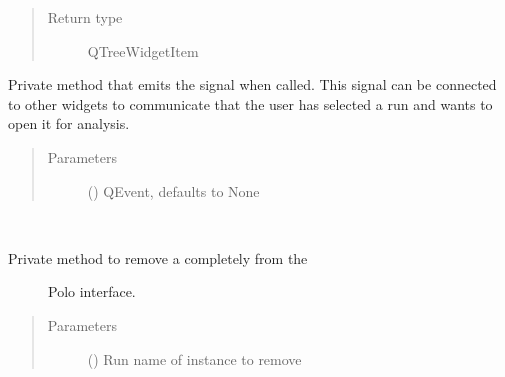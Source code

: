 \documentclass[letterpaper,10pt,english]{sphinxmanual}
\begin{document}
\begin{fulllineitems}
\begin{fulllineitems}
\begin{quote}
\begin{description}
\item[{Return type}] \leavevmode
QTreeWidgetItem

\end{description}\end{quote}

\end{fulllineitems}


\begin{fulllineitems}
\label{\detokenize{polo.widgets:polo.widgets.run_tree.RunTree._open_run_slot}}
Private method that emits the {\hyperref[\detokenize{polo.widgets:polo.widgets.run_tree.RunTree.opening_run}]{}} signal when called. This
signal can be connected to other widgets to communicate that the user
has selected a run and wants to open it for analysis.
\begin{quote}\begin{description}
\item[{Parameters}] \leavevmode
{} (\sphinxstyleliteralemphasis{\sphinxupquote{, }}) \textendash{} QEvent, defaults to None

\end{description}\end{quote}

\end{fulllineitems}


\begin{fulllineitems}
\label{\detokenize{polo.widgets:polo.widgets.run_tree.RunTree._remove_run}}~\begin{description}
\item[{Private method to remove a  completely from the}] \leavevmode
Polo interface.

\end{description}
\begin{quote}\begin{description}
\item[{Parameters}] \leavevmode
{} () \textendash{} Run name of  instance to remove


\end{description}
\end{quote}
\end{fulllineitems}
\end{fulllineitems}
\end{document}
